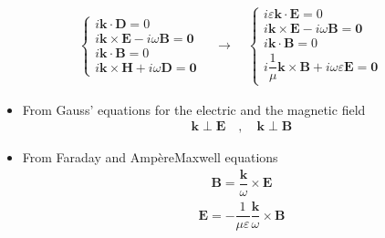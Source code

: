 \documentclass[letterpaper,10pt,english]{jupyterBook}
\begin{document}
\begin{equation*}
\begin{split}
\begin{cases}
 i \mathbf{k} \cdot \mathbf{D} = 0 \\
 i \mathbf{k} \times \mathbf{E} - i \omega \mathbf{B} = \mathbf{0} \\
 i \mathbf{k} \cdot \mathbf{B} = 0 \\
 i \mathbf{k} \times \mathbf{H} + i \omega \mathbf{D} = \mathbf{0}
\end{cases}
\quad \rightarrow \quad
\begin{cases}
 i \varepsilon \mathbf{k} \cdot \mathbf{E} = 0 \\
 i \mathbf{k} \times \mathbf{E} - i \omega \mathbf{B} = \mathbf{0} \\
 i \mathbf{k} \cdot \mathbf{B} = 0 \\
 i \dfrac{1}{\mu} \mathbf{k} \times \mathbf{B} + i \omega \varepsilon \mathbf{E} = \mathbf{0}
\end{cases}
\end{split}
\end{equation*}\begin{itemize}
\item {} 
\sphinxAtStartPar
From Gauss’ equations for the electric and the magnetic field
\begin{equation*}
\begin{split}\mathbf{k} \perp \mathbf{E} \quad , \quad \mathbf{k} \perp \mathbf{B}\end{split}
\end{equation*}
\item {} 
\sphinxAtStartPar
From Faraday and Ampère\sphinxhyphen{}Maxwell equations
\begin{equation*}
\begin{split}\mathbf{B} = \dfrac{\mathbf{k}}{\omega} \times \mathbf{E}\end{split}
\end{equation*}\begin{equation*}
\begin{split}\mathbf{E} = - \dfrac{1}{\mu \varepsilon}\dfrac{\mathbf{k}}{\omega} \times \mathbf{B}\end{split}
\end{equation*}
\end{itemize}
\end{document}
